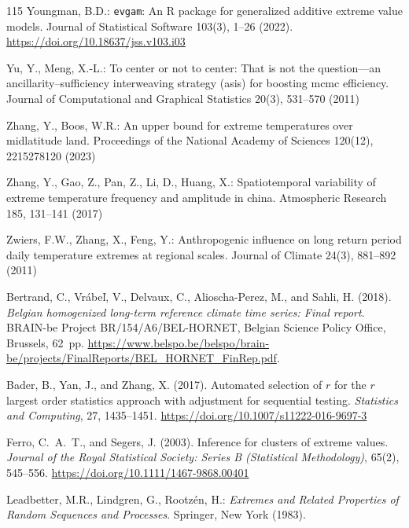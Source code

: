 \documentclass[11pt,a4paper]{article}
\begin{document}
\begin{thebibliography}{115}
		Youngman, B.D.: \texttt{evgam}: An R package for generalized additive extreme value models. Journal of Statistical Software 103(3), 1--26 (2022). \url{https://doi.org/10.18637/jss.v103.i03}
		
		Yu, Y., Meng, X.-L.: To center or not to center: That is not the question---an ancillarity--sufficiency interweaving strategy (asis) for boosting mcmc efficiency. Journal of Computational and Graphical Statistics 20(3), 531--570 (2011)
		
		Zhang, Y., Boos, W.R.: An upper bound for extreme temperatures over midlatitude land. Proceedings of the National Academy of Sciences 120(12), 2215278120 (2023)
		
		Zhang, Y., Gao, Z., Pan, Z., Li, D., Huang, X.: Spatiotemporal variability of extreme temperature frequency and amplitude in china. Atmospheric Research 185, 131--141 (2017)
		
		Zwiers, F.W., Zhang, X., Feng, Y.: Anthropogenic influence on long return period daily temperature extremes at regional scales. Journal of Climate 24(3), 881--892 (2011)
		
		Bertrand, C., Vrábeľ, V., Delvaux, C., Alioscha-Perez, M., and Sahli, H.
		(2018).
		\newblock \emph{Belgian homogenized long-term reference climate time
			series: Final report}.
		\newblock BRAIN-be Project BR/154/A6/BEL-HORNET, Belgian Science Policy
		Office, Brussels, 62~pp.
		\newblock
		\url{https://www.belspo.be/belspo/brain-be/projects/FinalReports/BEL_HORNET_FinRep.pdf}.
		
		Bader, B., Yan, J., and Zhang, X. (2017).
		Automated selection of $r$ for the $r$ largest order statistics
		approach with adjustment for sequential testing.
		\emph{Statistics and Computing}, 27, 1435--1451.
		\url{https://doi.org/10.1007/s11222-016-9697-3}
		
		Ferro, C.~A.~T., and Segers, J. (2003).
		Inference for clusters of extreme values.
		\emph{Journal of the Royal Statistical Society:
			Series B (Statistical Methodology)}, 65(2), 545--556.
		\url{https://doi.org/10.1111/1467-9868.00401}
		
		Leadbetter, M.R., Lindgren, G., Rootz{\'e}n, H.:
		\textit{Extremes and Related Properties of Random Sequences and Processes}.
		Springer, New York (1983).
		

\end{thebibliography}
\end{document}
